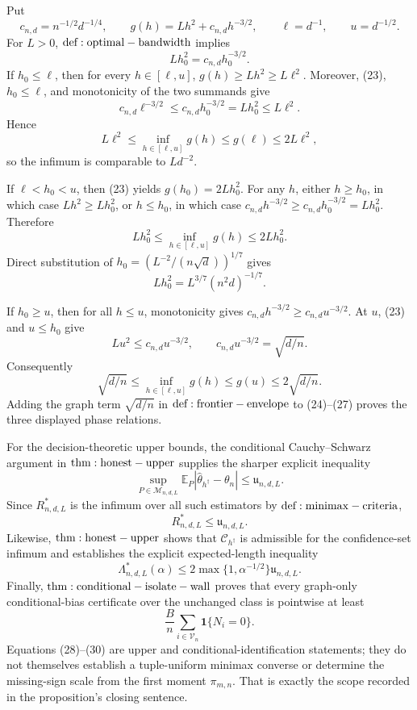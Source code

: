 Put
\[
 c_{n,d}=n^{-1/2}d^{-1/4},
 \qquad
 g(h)=Lh^2+c_{n,d}h^{-3/2},
 \qquad
 \ell=d^{-1},
 \qquad
 u=d^{-1/2}.
\]
For \(L>0\), \({\rm def:optimal-bandwidth}\) implies
\[
 Lh_0^2=c_{n,d}h_0^{-3/2}.
\tag{23}
\]
If \(h_0\leq\ell\), then for every \(h\in[\ell,u]\), \(g(h)\geq Lh^2\geq L\ell^2\).  Moreover, (23), \(h_0\leq\ell\), and monotonicity of the two summands give
\[
 c_{n,d}\ell^{-3/2}
 \leq c_{n,d}h_0^{-3/2}
 =Lh_0^2
 \leq L\ell^2.
\]
Hence
\[
 L\ell^2\leq\inf_{h\in[\ell,u]}g(h)
 \leq g(\ell)\leq2L\ell^2,
\tag{24}
\]
so the infimum is comparable to \(Ld^{-2}\).

If \(\ell<h_0<u\), then (23) yields \(g(h_0)=2Lh_0^2\).  For any \(h\), either \(h\geq h_0\), in which case \(Lh^2\geq Lh_0^2\), or \(h\leq h_0\), in which case
\(c_{n,d}h^{-3/2}\geq c_{n,d}h_0^{-3/2}=Lh_0^2\).  Therefore
\[
 Lh_0^2\leq\inf_{h\in[\ell,u]}g(h)
 \leq2Lh_0^2.
\tag{25}
\]
Direct substitution of \(h_0=(L^{-2}/(n\sqrt d))^{1/7}\) gives
\[
 Lh_0^2=L^{3/7}(n^2d)^{-1/7}.
\tag{26}
\]

If \(h_0\geq u\), then for all \(h\leq u\), monotonicity gives \(c_{n,d}h^{-3/2}\geq c_{n,d}u^{-3/2}\).  At \(u\), (23) and \(u\leq h_0\) give
\[
 Lu^2\leq c_{n,d}u^{-3/2},
 \qquad
 c_{n,d}u^{-3/2}=\sqrt{d/n}.
\]
Consequently
\[
 \sqrt{d/n}\leq\inf_{h\in[\ell,u]}g(h)
 \leq g(u)\leq2\sqrt{d/n}.
\tag{27}
\]
Adding the graph term \(\sqrt{d/n}\) in \({\rm def:frontier-envelope}\) to (24)--(27) proves the three displayed phase relations.

For the decision-theoretic upper bounds, the conditional Cauchy--Schwarz argument in \({\rm thm:honest-upper}\) supplies the sharper explicit inequality
\[
 \sup_{P\in\mathcal M_{n,d,L}}
 \mathbb E_P|\widehat\theta_{h^\dagger}-\theta_n|
 \leq\mathfrak u_{n,d,L}.
\]
Since \(R^*_{n,d,L}\) is the infimum over all such estimators by \({\rm def:minimax-criteria}\),
\[
 R^*_{n,d,L}\leq\mathfrak u_{n,d,L}.
\tag{28}
\]
Likewise, \({\rm thm:honest-upper}\) shows that \(\mathcal C_{h^\dagger}\) is admissible for the confidence-set infimum and establishes the explicit expected-length inequality
\[
 \Lambda^*_{n,d,L}(\alpha)
 \leq2\max\{1,\alpha^{-1/2}\}\mathfrak u_{n,d,L}.
\tag{29}
\]
Finally, \({\rm thm:conditional-isolate-wall}\) proves that every graph-only conditional-bias certificate over the unchanged class is pointwise at least
\[
 \frac Bn\sum_{i\in\mathcal V_n}\mathbf1\{N_i=0\}.
\tag{30}
\]
Equations (28)--(30) are upper and conditional-identification statements; they do not themselves establish a tuple-uniform minimax converse or determine the missing-sign scale from the first moment \(\pi_{m,n}\).  That is exactly the scope recorded in the proposition's closing sentence.